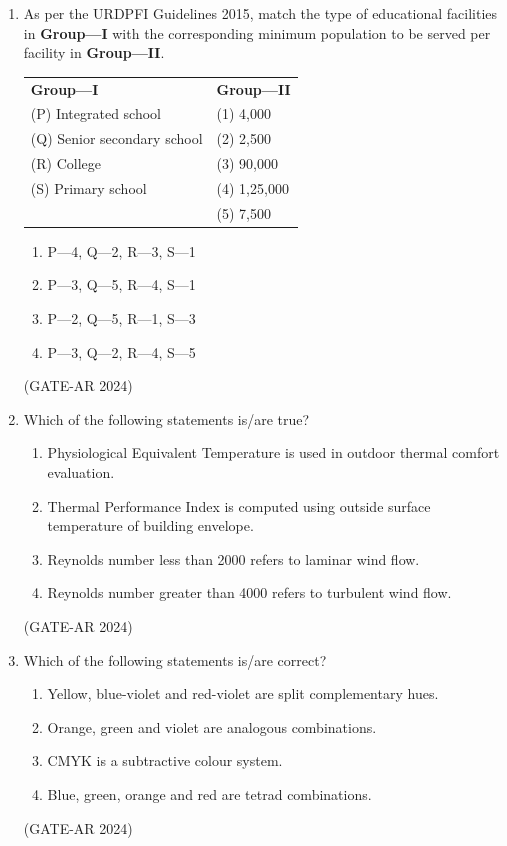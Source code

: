 \documentclass[a4paper,10pt]{article}
\begin{document}
\begin{enumerate}
    \item As per the URDPFI Guidelines 2015, match the type of educational facilities in \textbf{Group—I} with the corresponding minimum population to be served per facility in \textbf{Group—II}. \\
    \begin{tabular}{ l l }
    \textbf{Group—I} & \textbf{Group—II} \\
    (P) Integrated school & (1) 4,000 \\
    (Q) Senior secondary school & (2) 2,500 \\
    (R) College & (3) 90,000 \\
    (S) Primary school & (4) 1,25,000 \\
    & (5) 7,500 \\
    \end{tabular}
    \begin{multicols}{2}
    \begin{enumerate}
        \item P—4, Q—2, R—3, S—1
        \item P—3, Q—5, R—4, S—1
        \item P—2, Q—5, R—1, S—3
        \item P—3, Q—2, R—4, S—5
    \end{enumerate}
    \end{multicols}
    \hfill (GATE-AR 2024)

    \item Which of the following statements is/are true?
    \begin{enumerate}
        \item Physiological Equivalent Temperature is used in outdoor thermal comfort evaluation.
        \item Thermal Performance Index is computed using outside surface temperature of building envelope.
        \item Reynolds number less than 2000 refers to laminar wind flow.
        \item Reynolds number greater than 4000 refers to turbulent wind flow.
    \end{enumerate}
    \hfill (GATE-AR 2024)

    \item Which of the following statements is/are correct?
    \begin{enumerate}
        \item Yellow, blue-violet and red-violet are split complementary hues.
        \item Orange, green and violet are analogous combinations.
        \item CMYK is a subtractive colour system.
        \item Blue, green, orange and red are tetrad combinations.
    \end{enumerate}
    \hfill (GATE-AR 2024)


\end{enumerate}
\end{document}
